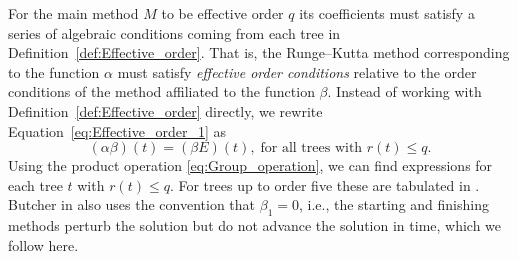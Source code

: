 \indent For the main method $M$ to be effective order $q$ its coefficients must satisfy a series of algebraic conditions coming from each tree in Definition~\ref{def:Effective_order}. That is, the Runge--Kutta method corresponding to the function $\alpha$ must satisfy \emph{effective order conditions} relative to the order conditions of the method affiliated to the function $\beta$.
Instead of working with Definition~\ref{def:Effective_order} directly, we rewrite Equation~\eqref{eq:Effective_order_1} as
\begin{equation}\label{eq:Effective_order_2}
	(\alpha\beta)(t) = (\beta E)(t), \; \text{for all trees with $r(t) \leq q$.}
\end{equation}
Using the product operation \eqref{eq:Group_operation}, we can find expressions for each tree $t$ with $r(t) \leq q$.  For trees up to order five these are tabulated in \cite[Table~3.89]{Butcher2008_book}.
Butcher in \cite{Butcher2008_book} also uses the convention that $\beta_1 = 0$, i.e., the starting and finishing methods perturb the solution but do not advance the solution in time, which we follow here.
